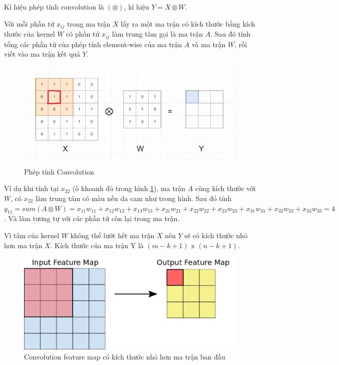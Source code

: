 Kí hiệu phép tính convolution là $(\otimes)$, kí hiệu $Y = X \otimes W$.

Với mỗi phần tử $x_{ij}$ trong ma trận $X$ lấy ra một ma trận có kích thước bằng kích thước của kernel $W$ có phần tử $x_{ij}$ làm trung tâm gọi là ma trận $A$. Sau đó tính tổng các phần tử của phép tính element-wise của ma trận $A$ và ma trận $W$, rồi viết vào ma trận kết quả $Y$.

\FloatBarrier
\begin{figure}[htp]
\begin{center}
\includegraphics[scale=0.65]{chap2/c2_figs/9.png}
\end{center}
\caption{Phép tính Convolution}
\label{fig:convolution}
\end{figure}
\FloatBarrier

Ví dụ khi tính tại $x_{22}$ (ô khoanh đỏ trong hình \ref{fig:convolution}), ma trận $A$ cùng kích thước với $W$, có $x_{22}$ làm trung tâm có màu nền da cam như trong hình. Sau đó tính $y_{11} = sum(A \otimes W) = x_{11}w_{11} + x_{12}w_{12} + x_{13}w_{13} + x_{21}w_{21} + x_{22}w_{22} + x_{23}w_{23} + x_{31}w_{31} + x_{32}w_{32} + x_{33}w_{33} = 4$. Và làm tương tự với các phần tử còn lại trong ma trận.

Vì tâm của kernel $W$ không thể lướt hết ma trận $X$ nên $Y$ sẽ có kích thước nhỏ hơn ma trận $X$. Kích thước của ma trận Y là $(m-k+1)$ x $(n-k+1)$.

\FloatBarrier
\begin{figure}[htp]
\begin{center}
\includegraphics[scale=0.4]{chap2/c2_figs/convolution_1.png}
\end{center}
\caption{Convolution feature map có kích thước nhỏ hơn ma trận ban đầu}
\label{fig:convolution-feature}
\end{figure}
\FloatBarrier

